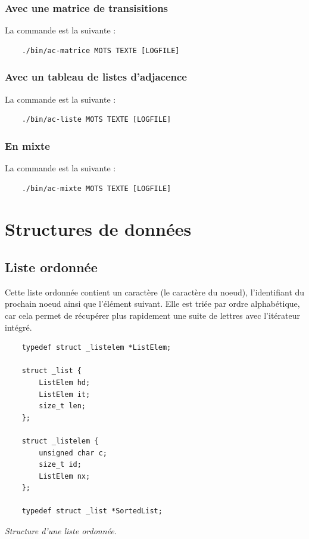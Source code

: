 \subsubsection*{Avec une matrice de transisitions}
La commande est la suivante :
\begin{verbatim}
    ./bin/ac-matrice MOTS TEXTE [LOGFILE]
\end{verbatim}

\subsubsection*{Avec un tableau de listes d'adjacence}
La commande est la suivante :
\begin{verbatim}
    ./bin/ac-liste MOTS TEXTE [LOGFILE]
\end{verbatim}

\subsubsection*{En mixte}
La commande est la suivante :
\begin{verbatim}
    ./bin/ac-mixte MOTS TEXTE [LOGFILE]
\end{verbatim}

\newpage
\section{Structures de données}
\subsection{Liste ordonnée}
Cette liste ordonnée contient un caractère (le caractère du noeud), l'identifiant
du prochain noeud ainsi que l'élément suivant. Elle est triée par ordre alphabétique, car cela permet de
récupérer plus rapidement une suite de lettres avec l'itérateur intégré.

\begin{verbatim}
    typedef struct _listelem *ListElem;

    struct _list {
        ListElem hd;
        ListElem it;
        size_t len;
    };

    struct _listelem {
        unsigned char c;
        size_t id;
        ListElem nx;
    };

    typedef struct _list *SortedList;
\end{verbatim}
\begin{center}\textit{Structure d'une liste ordonnée.}\end{center}

